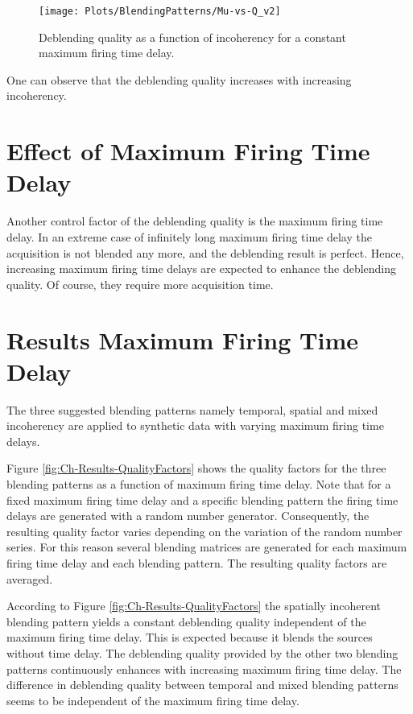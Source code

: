 \begin{figure}
	\centering
	\texttt{[image: Plots/BlendingPatterns/Mu-vs-Q\_v2]}
	\caption{Deblending quality as a function of incoherency for a constant maximum firing time delay.}
	\label{fig:Ch-Results-Quality-vs-Incoherency}
\end{figure}

One can observe that the deblending quality increases with increasing incoherency.


\section{Effect of Maximum Firing Time Delay}

Another control factor of the deblending quality is the maximum firing time delay. In an extreme case of infinitely long maximum firing time delay the acquisition is not blended any more, and the deblending result is perfect. Hence, increasing maximum firing time delays are expected to enhance the deblending quality. Of course, they require more acquisition time.



\section{Results Maximum Firing Time Delay}

The three suggested blending patterns namely temporal, spatial and mixed incoherency are applied to synthetic data with varying maximum firing time delays. 

Figure \ref{fig:Ch-Results-QualityFactors} shows the quality factors for the three blending patterns as a function of maximum firing time delay. Note that for a fixed maximum firing time delay and a specific blending pattern the firing time delays are generated with a random number generator. Consequently, the resulting quality factor varies depending on the variation of the random number series. For this reason several blending matrices are generated for each maximum firing time delay and each blending pattern. The resulting quality factors are averaged.

According to Figure \ref{fig:Ch-Results-QualityFactors} the spatially incoherent blending pattern yields a constant deblending quality independent of the maximum firing time delay. This is expected because it blends the sources without time delay. The deblending quality provided by the other two blending patterns continuously enhances with increasing maximum firing time delay. The difference in deblending quality between temporal and mixed blending patterns seems to be independent of the maximum firing time delay.

